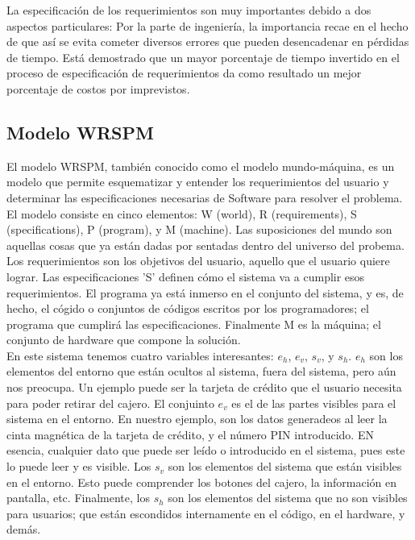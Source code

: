 La especificación de los requerimientos son muy importantes debido a dos aspectos particulares: Por la parte de ingeniería, la importancia recae en el hecho de que así se evita cometer diversos errores que pueden desencadenar en pérdidas de tiempo. Está demostrado que un mayor porcentaje de tiempo invertido en el proceso de especificación de requerimientos da como resultado un mejor porcentaje de costos por imprevistos.

\subsection{Modelo WRSPM}

El modelo WRSPM, también conocido como el modelo mundo-máquina, es un modelo que permite esquematizar y entender los requerimientos del usuario y determinar las especificaciones necesarias de Software para resolver el problema. El modelo consiste en cinco elementos: W (world), R (requirements), S (specifications), P (program), y M (machine). Las suposiciones del mundo son aquellas cosas que ya están dadas por sentadas dentro del universo del probema. Los requerimientos son los objetivos del usuario, aquello que el usuario quiere lograr. Las especificaciones 'S' definen cómo el sistema va a cumplir esos requerimientos. El programa ya está inmerso en el conjunto del sistema, y es, de hecho, el cógido o conjuntos de códigos escritos por los programadores; el programa que cumplirá las especificaciones. Finalmente M es la máquina; el conjunto de hardware que compone la solución. \\

En este sistema tenemos cuatro variables interesantes: $e_h$, $e_v$, $s_v$, y $s_h$. $e_h$ son los elementos del entorno que están ocultos al sistema, fuera del sistema, pero aún nos preocupa. Un ejemplo puede ser la tarjeta de crédito que el usuario necesita para poder retirar del cajero. El conjuinto $e_v$ es el de las partes visibles para el sistema en el entorno. En nuestro ejemplo, son los datos generadeos al leer la cinta magnética de la tarjeta de crédito, y el número PIN introducido. EN esencia, cualquier dato que puede ser leído o introducido en el sistema, pues este lo puede leer y es visible. Los $s_v$ son los elementos del sistema que están visibles en el entorno. Esto puede comprender los botones del cajero, la información en pantalla, etc. Finalmente, los $s_h$ son los elementos del sistema que no son visibles para usuarios; que están escondidos internamente en el código, en el hardware, y demás. 

